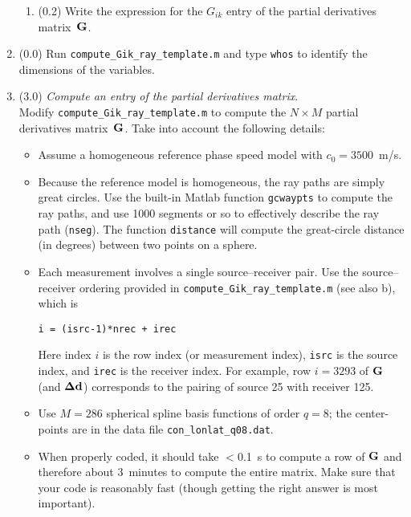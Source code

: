 \documentclass[11pt,titlepage,fleqn]{article}
\begin{document}
\begin{enumerate}
\begin{enumerate}
\item (0.2) Write the expression for the $G_{ik}$ entry of the partial derivatives matrix~$\mbox{${\bf G}$}$.
\end{enumerate}


\item (0.0) Run \verb+compute_Gik_ray_template.m+ and type \verb+whos+ to identify the dimensions of the variables.


\item (3.0) {\em Compute an entry of the partial derivatives matrix}. \\
Modify \verb+compute_Gik_ray_template.m+ to compute the $N \times M$ partial derivatives matrix~$\mbox{${\bf G}$}$.
Take into account the following details:
%
\begin{itemize}
\item Assume a homogeneous reference phase speed model with $c_0 = 3500$~m/s.

\item Because the reference model is homogeneous, the ray paths are simply great circles.  Use the built-in Matlab function \verb+gcwaypts+ to compute the ray paths, and use 1000 segments or so to effectively describe the ray path (\verb+nseg+). The function \verb+distance+ will compute the great-circle distance (in degrees) between two points on a sphere.

\item Each measurement involves a single source--receiver pair. Use the source--receiver ordering provided in \verb+compute_Gik_ray_template.m+ (see also b), which is
%
\begin{verbatim}
i = (isrc-1)*nrec + irec
\end{verbatim}
%
Here index $i$ is the row index (or measurement index), \verb+isrc+ is the source index, and \verb+irec+ is the receiver index.
For example, row $i=3293$ of $\mbox{${\bf G}$}$ (and $\mbox{\boldmath $\bf \Delta$}\mbox{${\bf d}$}$) corresponds to the pairing of source 25 with receiver 125.

\item Use $M=286$ spherical spline basis functions of order $q=8$; the center-points are in the data file \verb+con_lonlat_q08.dat+.

\item When properly coded, it should take $<$0.1~s to compute a row of $\mbox{${\bf G}$}$ and therefore about 3~minutes to compute the entire matrix. Make sure that your code is reasonably fast (though getting the right answer is most important).


\end{itemize}
\end{enumerate}
\end{document}

